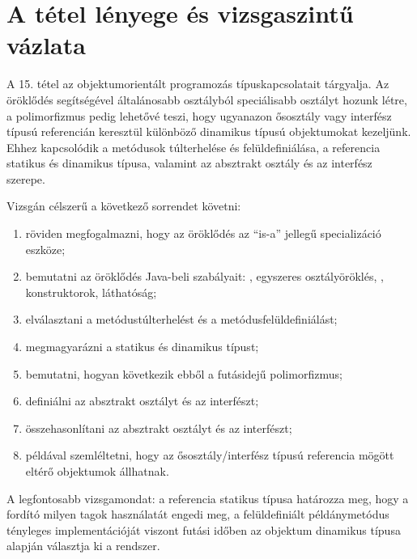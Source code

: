 \section{A tétel lényege és vizsgaszintű vázlata}

\begin{summarybox}
A 15. tétel az objektumorientált programozás típuskapcsolatait tárgyalja. Az öröklődés segítségével általánosabb osztályból speciálisabb osztályt hozunk létre, a polimorfizmus pedig lehetővé teszi, hogy ugyanazon ősosztály vagy interfész típusú referencián keresztül különböző dinamikus típusú objektumokat kezeljünk. Ehhez kapcsolódik a metódusok túlterhelése és felüldefiniálása, a referencia statikus és dinamikus típusa, valamint az absztrakt osztály és az interfész szerepe.
\end{summarybox}

Vizsgán célszerű a következő sorrendet követni:

\begin{enumerate}
  \item röviden megfogalmazni, hogy az öröklődés az ``is-a'' jellegű specializáció eszköze;
  \item bemutatni az öröklődés Java-beli szabályait: , egyszeres osztályöröklés, , konstruktorok, láthatóság;
  \item elválasztani a metódustúlterhelést és a metódusfelüldefiniálást;
  \item megmagyarázni a statikus és dinamikus típust;
  \item bemutatni, hogyan következik ebből a futásidejű polimorfizmus;
  \item definiálni az absztrakt osztályt és az interfészt;
  \item összehasonlítani az absztrakt osztályt és az interfészt;
  \item példával szemléltetni, hogy az ősosztály/interfész típusú referencia mögött eltérő objektumok állhatnak.
\end{enumerate}

A legfontosabb vizsgamondat: a referencia statikus típusa határozza meg, hogy a fordító milyen tagok használatát engedi meg, a felüldefiniált példánymetódus tényleges implementációját viszont futási időben az objektum dinamikus típusa alapján választja ki a rendszer.

\begin{center}

\end{center}

